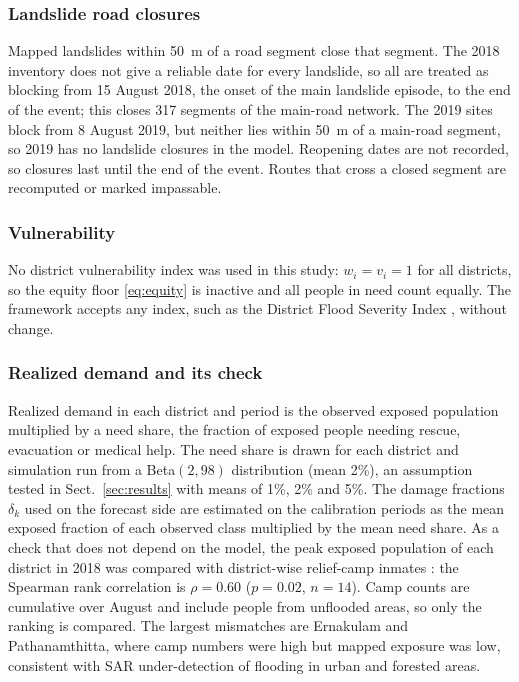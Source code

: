 \documentclass[pdflatex,sn-basic]{sn-jnl}
\theoremstyle{plain}%
\theoremstyle{remark}%
\theoremstyle{definition}%
\begin{document}
\subsubsection{Landslide road closures}
 Mapped landslides within 50~m of a road segment close that segment. The 2018 inventory \citep{Hao2020} does not give a reliable date for every landslide, so all are treated as blocking from 15 August 2018, the onset of the main landslide episode, to the end of the event; this closes 317 segments of the main-road network. The 2019 sites block from 8 August 2019, but neither lies within 50~m of a main-road segment, so 2019 has no landslide closures in the model. Reopening dates are not recorded, so closures last until the end of the event. Routes that cross a closed segment are recomputed or marked impassable.

\subsubsection{Vulnerability}
 No district vulnerability index was used in this study: $w_i = v_i = 1$ for all districts, so the equity floor \eqref{eq:equity} is inactive and all people in need count equally. The framework accepts any index, such as the District Flood Severity Index \citep{Saharia2025}, without change.

\subsubsection{Realized demand and its check}
 Realized demand in each district and period is the observed exposed population multiplied by a need share, the fraction of exposed people needing rescue, evacuation or medical help. The need share is drawn for each district and simulation run from a Beta$(2, 98)$ distribution (mean 2\%), an assumption tested in Sect.~\ref{sec:results} with means of 1\%, 2\% and 5\%. The damage fractions $\delta_k$ used on the forecast side are estimated on the calibration periods as the mean exposed fraction of each observed class multiplied by the mean need share. As a check that does not depend on the model, the peak exposed population of each district in 2018 was compared with district-wise relief-camp inmates \citep{GoK2018Memo}: the Spearman rank correlation is $\rho = 0.60$ ($p = 0.02$, $n = 14$). Camp counts are cumulative over August and include people from unflooded areas, so only the ranking is compared. The largest mismatches are Ernakulam and Pathanamthitta, where camp numbers were high but mapped exposure was low, consistent with SAR under-detection of flooding in urban and forested areas.
\end{document}
